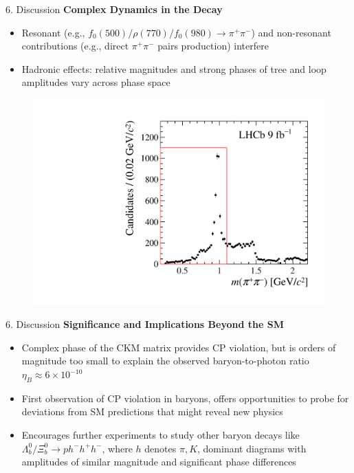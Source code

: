 \documentclass[xcolor=dvipsnames]{beamer}
\def\Ld{\Lambda}
\begin{document}
\begin{frame}{6. Discussion}
\textbf{Complex Dynamics in the Decay}\\
\begin{itemize}
    \item Resonant (e.g., $f_{0}(500)/\rho(770)/f_{0}(980) \to \pi^+ \pi^-$) and non-resonant contributions (e.g., direct $\pi^+ \pi^-$ pairs production) interfere
    \item Hadronic effects: relative magnitudes and strong phases of tree and loop amplitudes vary across phase space
\end{itemize}
\begin{figure}
    \centering
    \includegraphics[width=0.4\linewidth]{FigED2b.pdf}
\end{figure}
\end{frame}

\begin{frame}{6. Discussion}
\textbf{Significance and Implications Beyond the SM}\\
\begin{itemize}
    \item Complex phase of the CKM matrix provides CP violation, but is orders of magnitude too small to explain the observed baryon-to-photon ratio $\eta_B \approx 6 \times 10^{-10}$
    \item First observation of CP violation in baryons, offers opportunities to probe for deviations from SM predictions that might reveal new physics
    \item Encourages further experiments to study other baryon decays like $\Ld_{b}^{0}/\Xi_b^0 \to p h^- h^+ h^-$, where $h$ denotes $\pi, K$, dominant diagrams with amplitudes of similar magnitude and significant phase differences
\end{itemize}
\end{frame}
\end{document}
